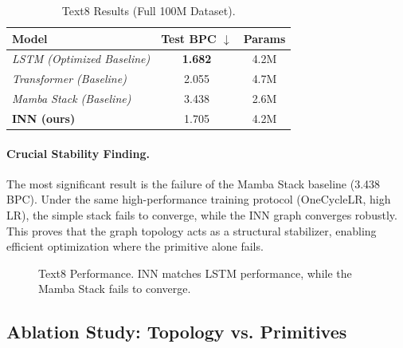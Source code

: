 \documentclass{article}
\begin{document}
\begin{table}[H]
\centering
\caption{Text8 Results (Full 100M Dataset).}
\begin{tabular}{lcc}
\toprule
\textbf{Model} & \textbf{Test BPC} $\downarrow$ & \textbf{Params} \\
\midrule
\textit{LSTM (Optimized Baseline)} & \textbf{1.682} & 4.2M \\
\textit{Transformer (Baseline)} & 2.055 & 4.7M \\
\textit{Mamba Stack (Baseline)} & 3.438 & 2.6M \\
\textbf{INN (ours)} & 1.705 & 4.2M \\
\bottomrule
\end{tabular}
\label{tab:text8_results}
\end{table}

\paragraph{Crucial Stability Finding.} The most significant result is the failure of the Mamba Stack baseline (3.438 BPC). Under the same high-performance training protocol (OneCycleLR, high LR), the simple stack fails to converge, while the INN graph converges robustly. This proves that the graph topology acts as a structural stabilizer, enabling efficient optimization where the primitive alone fails.

\begin{figure}[H]
\centering
{}
\caption{Text8 Performance. INN matches LSTM performance, while the Mamba Stack fails to converge.}
\label{fig:text8_chart}
\end{figure}

\subsection{Ablation Study: Topology vs. Primitives}
\end{document}
